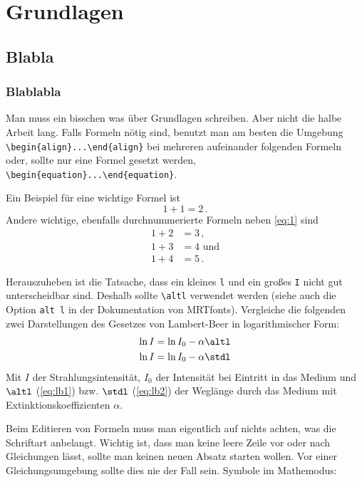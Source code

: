 \chapter{Grundlagen}
\begingroup
\color{blue}
\section{Blabla}
\subsection{Blablabla}
Man muss ein bisschen was über Grundlagen schreiben. Aber nicht die halbe Arbeit
lang. Falls Formeln nötig sind, benutzt man am besten die Umgebung
\verb|\begin{align}|\hskip0pt\verb|...|\hskip0pt\verb|\end{align}|
bei mehreren aufeinander folgenden Formeln oder, sollte nur eine Formel gesetzt
werden, 
\verb|\begin{equation}|\hskip0pt\verb|...|\hskip0pt\verb|\end{equation}|.

Ein Beispiel für eine wichtige Formel ist
\begin{equation}
  1+1 = 2\,\text{.}
  \label{eq:1}
\end{equation}
Andere wichtige, ebenfalls durchnummerierte Formeln neben \autoref{eq:1} sind
\begin{align}
  1+2 &= 3\,\text{,}\label{eq:2}\\
  1+3 &= 4\text{ und}\label{eq:3}\\
  1+4 &= 5\,\text{.}\label{eq:4}
\end{align}

Herauszuheben ist die Tatsache, dass ein kleines \texttt{l} und ein großes
\texttt{I} nicht gut unterscheidbar sind. Deshalb sollte \verb|\altl| verwendet
werden (siehe auch die Option \texttt{alt l} in der Dokumentation von
\textrm{MRTfonts}). Vergleiche die folgenden zwei Darstellungen des Gesetzes von
Lambert-Beer in logarithmischer Form:
\begin{align}
  \ln I &= \ln I_0 - \alpha\altl\label{eq:lb1}\\
  \ln I &= \ln I_0 - \alpha\stdl\label{eq:lb2}
\end{align}
Mit $I$ der Strahlungsintensität, $I_0$ der Intensität bei Eintritt in das
Medium und $\altl$ (\autoref{eq:lb1}) bzw. $\stdl$ (\autoref{eq:lb2}) der
Weglänge durch das Medium mit Extinktionskoeffizienten $\alpha$.

Beim Editieren von Formeln muss man eigentlich auf nichts achten, was die
Schriftart anbelangt. Wichtig ist, dass man keine leere Zeile vor oder nach
Gleichungen lässt, sollte man keinen neuen Absatz starten wollen. Vor einer
Gleichungsumgebung sollte dies nie der Fall sein.
\newpage
Symbole im Mathemodus:

